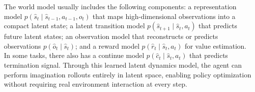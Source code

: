 The world model usually includes the following components: a representation model $p(\hat{s}_{t} \mid \hat{s}_{t-1}, a_{t-1}, o_{t})$ that maps high-dimensional observations into a compact latent state; a latent transition model $p(\hat{s}_{t+1} \mid \hat{s}_t, a_t)$ that predicts future latent states; an observation model that reconstructs or predicts observations $p(\hat{o}_{t} \mid \hat{s}_{t})$; and a reward model $p(\hat{r}_{t} \mid \hat{s}_{t}, a_t)$ for value estimation. In some tasks, there also has a continue model $p(\hat{c}_{t} \mid \hat{s}_{t}, a_t) $ that predicts termination signal. Through this learned latent dynamics model, the agent can perform imagination rollouts entirely in latent space, enabling policy optimization without requiring real environment interaction at every step.